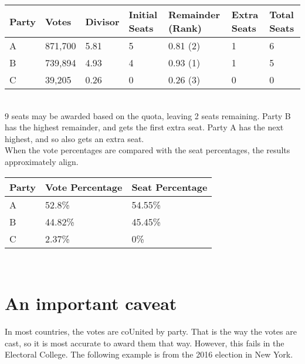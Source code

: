 \documentclass{article}
\begin{document}
    \begin{adjustbox}{center}
    \begin{tabular}{ |l|l|l|l|l|l|l| }
        \hline
        Party & Votes & Divisor & Initial Seats & Remainder (Rank) & Extra Seats & Total Seats \\
        \hline
        A & 871,700 & 5.81 & 5 & 0.81 (2) & 1 & 6 \\
        \hline
        B & 739,894 & 4.93 & 4 & 0.93 (1) & 1 & 5 \\
        \hline
        C & 39,205 & 0.26 & 0 & 0.26 (3) & 0 & 0 \\
        \hline
    \end{tabular}
    \end{adjustbox}\\
    
    9 seats may be awarded based on the quota, leaving 2 seats remaining. Party B has the highest remainder, and gets the first extra seat. Party A has the next highest, and so also gets an extra seat. \\

    When the vote percentages are compared with the seat percentages, the results approximately align.\\
    
    \begin{adjustbox}{center}
    \begin{tabular}{ |l|l|l| }
        \hline
        Party & Vote Percentage & Seat Percentage \\
        \hline
        A & 52.8\% & 54.55\% \\
        \hline
        B & 44.82\% & 45.45\% \\
        \hline
        C & 2.37\% & 0\% \\
        \hline
    \end{tabular}
    \end{adjustbox}\\

    \section{An important caveat}

    In most countries, the votes are coUnited by party. That is the way the votes are cast, so it is most accurate to award them that way. However, this fails in the Electoral College. The following example is from the 2016 election in New York.\\
\end{document}

